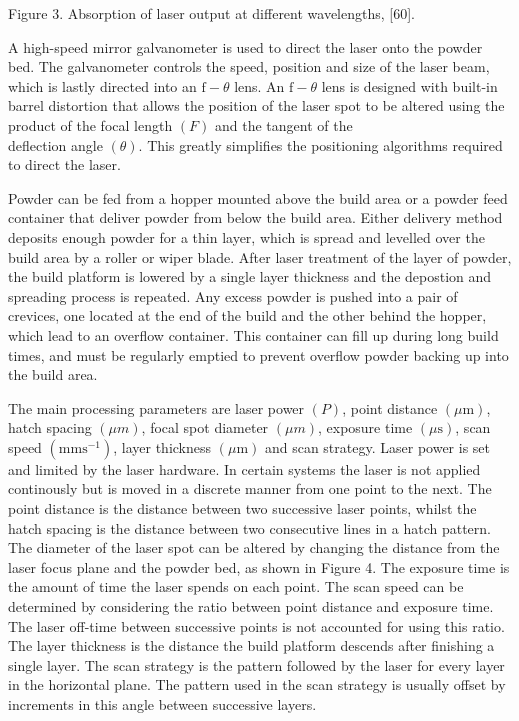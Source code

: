 \documentclass[10pt]{article}
\begin{document}
Figure 3. Absorption of laser output at different wavelengths, [60].

A high-speed mirror galvanometer is used to direct the laser onto the powder bed. The galvanometer controls the speed, position and size of the laser beam, which is lastly directed into an $\mathrm{f}-\theta$ lens. An $\mathrm{f}-\theta$ lens is designed with built-in barrel distortion that allows the position of the laser spot to be altered using the product of the focal length $(F)$ and the tangent of the\\
deflection angle $(\theta)$. This greatly simplifies the positioning algorithms required to direct the laser.

Powder can be fed from a hopper mounted above the build area or a powder feed container that deliver powder from below the build area. Either delivery method deposits enough powder for a thin layer, which is spread and levelled over the build area by a roller or wiper blade. After laser treatment of the layer of powder, the build platform is lowered by a single layer thickness and the depostion and spreading process is repeated. Any excess powder is pushed into a pair of crevices, one located at the end of the build and the other behind the hopper, which lead to an overflow container. This container can fill up during long build times, and must be regularly emptied to prevent overflow powder backing up into the build area.

The main processing parameters are laser power $(P)$, point distance $(\mu \mathrm{m})$, hatch spacing $(\mu m)$, focal spot diameter $(\mu m)$, exposure time $(\mu \mathrm{s})$, scan speed $\left(\mathrm{mms}^{-1}\right)$, layer thickness $(\mu \mathrm{m})$ and scan strategy. Laser power is set and limited by the laser hardware. In certain systems the laser is not applied continously but is moved in a discrete manner from one point to the next. The point distance is the distance between two successive laser points, whilst the hatch spacing is the distance between two consecutive lines in a hatch pattern. The diameter of the laser spot can be altered by changing the distance from the laser focus plane and the powder bed, as shown in Figure 4. The exposure time is the amount of time the laser spends on each point. The scan speed can be determined by considering the ratio between point distance and exposure time. The laser off-time between successive points is not accounted for using this ratio. The layer thickness is the distance the build platform descends after finishing a single layer. The scan strategy is the pattern followed by the laser for every layer in the horizontal plane. The pattern used in the scan strategy is usually offset by increments in this angle between successive layers.
\end{document}
